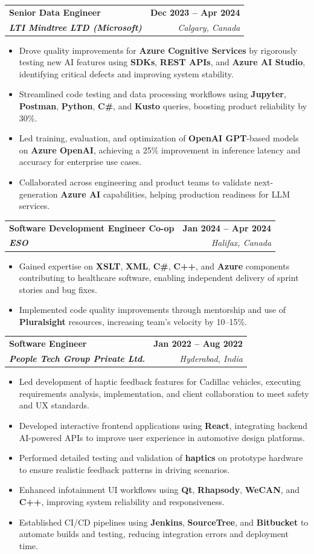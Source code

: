 \documentclass[letterpaper,11pt]{article}
\makeatletter
\newcommand{\resumeItem}[1]{
  \item\small{
    {#1 \vspace{-2pt}}
  }
}
\newcommand{\resumeSubheading}[4]{
  \vspace{-2pt}\item
    \begin{tabular*}{1.0\textwidth}[t]{l@{\extracolsep{\fill}}r}
      \textbf{#1} & \textbf{\small #2} \\
      \textit{\small#3} & \textit{\small #4} \\
    \end{tabular*}\vspace{-7pt}
}
\newcommand{\resumeItemListStart}{\begin{itemize}}
\newcommand{\resumeItemListEnd}{\end{itemize}\vspace{-5pt}}
\makeatother
\begin{document}
    \resumeSubheading
      {\textbf{Senior Data Engineer}}{\textbf{Dec 2023 -- Apr 2024}}
      {\textbf{LTI Mindtree LTD (Microsoft)}}{Calgary, Canada}
      \resumeItemListStart
        \resumeItem{Drove quality improvements for \textbf{Azure Cognitive Services} by rigorously testing new AI features using \textbf{SDKs}, \textbf{REST APIs}, and \textbf{Azure AI Studio}, identifying critical defects and improving system stability.}
        \resumeItem{Streamlined code testing and data processing workflows using \textbf{Jupyter}, \textbf{Postman}, \textbf{Python}, \textbf{C\#}, and \textbf{Kusto} queries, boosting product reliability by 30\%.}
        \resumeItem{Led training, evaluation, and optimization of \textbf{OpenAI GPT}-based models on \textbf{Azure OpenAI}, achieving a 25\% improvement in inference latency and accuracy for enterprise use cases.}
        \resumeItem{Collaborated across engineering and product teams to validate next-generation \textbf{Azure AI} capabilities, helping production readiness for LLM services.}
      \resumeItemListEnd
    
    \resumeSubheading
      {\textbf{Software Development Engineer Co-op}}{\textbf{Jan 2024 -- Apr 2024}}
      {\textbf{ESO}}{Halifax, Canada}
      \resumeItemListStart
        \resumeItem{Gained expertise on \textbf{XSLT}, \textbf{XML}, \textbf{C\#}, \textbf{C++}, and \textbf{Azure} components contributing to healthcare software, enabling independent delivery of sprint stories and bug fixes.}
        \resumeItem{Implemented code quality improvements through mentorship and use of \textbf{Pluralsight} resources, increasing team's velocity by 10--15\%.}
      \resumeItemListEnd

    \resumeSubheading
      {\textbf{Software Engineer}}{\textbf{Jan 2022 -- Aug 2022}}
      {\textbf{People Tech Group Private Ltd.}}{Hyderabad, India}
      \resumeItemListStart
        \resumeItem{Led development of haptic feedback features for Cadillac vehicles, executing requirements analysis, implementation, and client collaboration to meet safety and UX standards.}
        \resumeItem{Developed interactive frontend applications using \textbf{React}, integrating backend AI-powered APIs to improve user experience in automotive design platforms.}
        \resumeItem{Performed detailed testing and validation of \textbf{haptics} on prototype hardware to ensure realistic feedback patterns in driving scenarios.}
        \resumeItem{Enhanced infotainment UI workflows using \textbf{Qt}, \textbf{Rhapsody}, \textbf{WeCAN}, and \textbf{C++}, improving system reliability and responsiveness.}
        \resumeItem{Established CI/CD pipelines using \textbf{Jenkins}, \textbf{SourceTree}, and \textbf{Bitbucket} to automate builds and testing, reducing integration errors and deployment time.}
      \resumeItemListEnd
\end{document}
